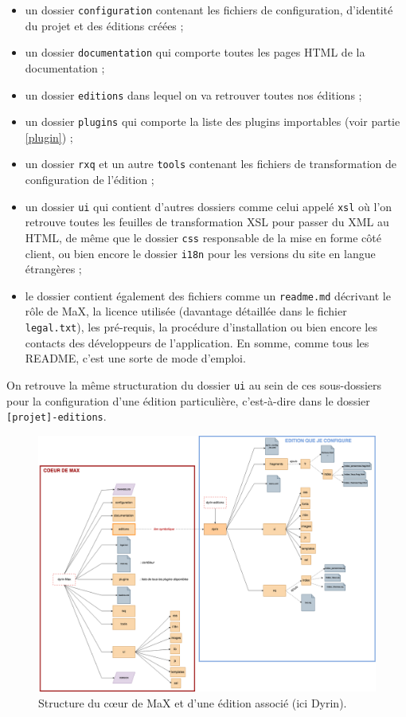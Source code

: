 \documentclass[a4paper,12pt,twoside]{book}
\begin{document}
\begin{itemize}
    \item un dossier \texttt{configuration} contenant les fichiers de configuration, d'identité du projet et des éditions créées ;
    \item un dossier \texttt{documentation} qui comporte toutes les pages \acrshort{HTML} de la documentation ;
    \item un dossier \texttt{editions} dans lequel on va retrouver toutes nos éditions ;
    \item un dossier \texttt{plugins} qui comporte la liste des plugins importables (voir partie \ref{plugin}) ;
    \item un dossier \texttt{rxq} et un autre \texttt{tools} contenant les fichiers de transformation de configuration de l'édition ;
    \item un dossier\label{ui} \texttt{ui} qui contient d'autres dossiers comme celui appelé \texttt{xsl} où l'on retrouve toutes les feuilles de transformation \acrshort{XSL} pour passer du XML au \acrshort{HTML}, de même que le dossier \texttt{css} responsable de la mise en forme côté client, ou bien encore le dossier \texttt{i18n} pour les versions du site en langue étrangères ;
    \item le dossier contient également des fichiers comme un \texttt{readme.md} décrivant le rôle de MaX, la licence utilisée (davantage détaillée dans le fichier \texttt{legal.txt}), les pré-requis, la procédure d'installation ou bien encore les contacts des développeurs de l'application. En somme, comme tous les README, c'est une sorte de mode d'emploi.
\end{itemize}
On retrouve la même structuration du dossier \texttt{ui} au sein de ces sous-dossiers pour la configuration d'une édition particulière, c'est-à-dire dans le dossier \texttt{[projet]-editions}.


\begin{figure}[H]
    \centering
    \includegraphics[width=18cm]{img/MaX/structure_MaX.png}
    \caption{Structure du c\oe{}ur de MaX et d'une édition associé (ici Dyrin).}
    \label{arbo}
\end{figure}
\end{document}
